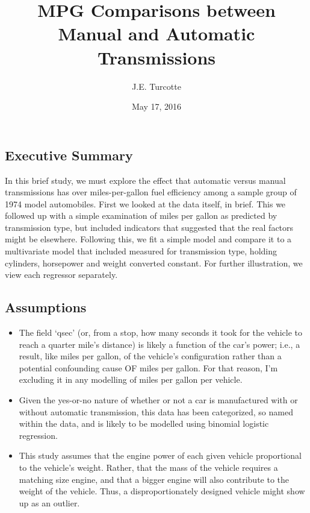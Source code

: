 \documentclass[]{article}
\title{MPG Comparisons between Manual and Automatic Transmissions}
\author{J.E. Turcotte}
\date{May 17, 2016}
\begin{document}
\maketitle


\subsection{Executive Summary}\label{executive-summary}

In this brief study, we must explore the effect that automatic versus
manual transmissions has over miles-per-gallon fuel efficiency among a
sample group of 1974 model automobiles. First we looked at the data
itself, in brief. This we followed up with a simple examination of miles
per gallon as predicted by transmission type, but included indicators
that suggested that the real factors might be elsewhere. Following this,
we fit a simple model and compare it to a multivariate model that
included measured for transmission type, holding cylinders, horsepower
and weight converted constant. For further illustration, we view each
regressor separately.

\subsection{Assumptions}\label{assumptions}

\begin{itemize}
\itemsep1pt\parskip0pt
\item
  The field `qsec' (or, from a stop, how many seconds it took for the
  vehicle to reach a quarter mile's distance) is likely a function of
  the car's power; i.e., a result, like miles per gallon, of the
  vehicle's configuration rather than a potential confounding cause OF
  miles per gallon. For that reason, I'm excluding it in any modelling
  of miles per gallon per vehicle.
\item
  Given the yes-or-no nature of whether or not a car is manufactured
  with or without automatic transmission, this data has been
  categorized, so named within the data, and is likely to be modelled
  using binomial logistic regression.
\item
  This study assumes that the engine power of each given vehicle
  proportional to the vehicle's weight. Rather, that the mass of the
  vehicle requires a matching size engine, and that a bigger engine will
  also contribute to the weight of the vehicle. Thus, a
  disproportionately designed vehicle might show up as an outlier.
\end{itemize}
\end{document}
